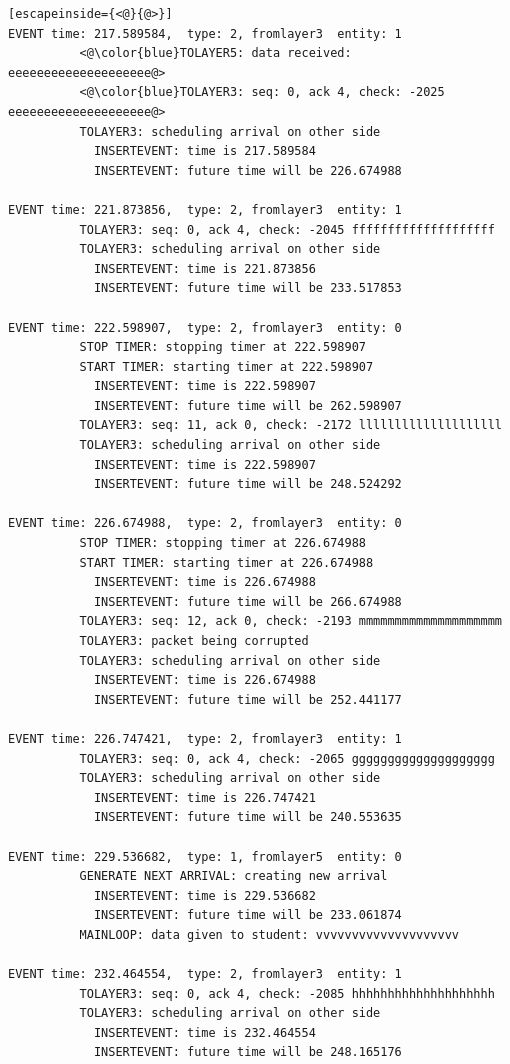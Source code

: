 \documentclass[paper=a4, fontsize=11pt]{scrartcl}
\numberwithin{equation}{section}		%
\numberwithin{figure}{section}			%
\numberwithin{table}{section}				%
\begin{document}
\begin{lstlisting}[escapeinside={<@}{@>}]
EVENT time: 217.589584,  type: 2, fromlayer3  entity: 1
          <@\color{blue}TOLAYER5: data received: eeeeeeeeeeeeeeeeeeee@>
          <@\color{blue}TOLAYER3: seq: 0, ack 4, check: -2025 eeeeeeeeeeeeeeeeeeee@>
          TOLAYER3: scheduling arrival on other side
            INSERTEVENT: time is 217.589584
            INSERTEVENT: future time will be 226.674988

EVENT time: 221.873856,  type: 2, fromlayer3  entity: 1
          TOLAYER3: seq: 0, ack 4, check: -2045 ffffffffffffffffffff
          TOLAYER3: scheduling arrival on other side
            INSERTEVENT: time is 221.873856
            INSERTEVENT: future time will be 233.517853

EVENT time: 222.598907,  type: 2, fromlayer3  entity: 0
          STOP TIMER: stopping timer at 222.598907
          START TIMER: starting timer at 222.598907
            INSERTEVENT: time is 222.598907
            INSERTEVENT: future time will be 262.598907
          TOLAYER3: seq: 11, ack 0, check: -2172 llllllllllllllllllll
          TOLAYER3: scheduling arrival on other side
            INSERTEVENT: time is 222.598907
            INSERTEVENT: future time will be 248.524292

EVENT time: 226.674988,  type: 2, fromlayer3  entity: 0
          STOP TIMER: stopping timer at 226.674988
          START TIMER: starting timer at 226.674988
            INSERTEVENT: time is 226.674988
            INSERTEVENT: future time will be 266.674988
          TOLAYER3: seq: 12, ack 0, check: -2193 mmmmmmmmmmmmmmmmmmmm
          TOLAYER3: packet being corrupted
          TOLAYER3: scheduling arrival on other side
            INSERTEVENT: time is 226.674988
            INSERTEVENT: future time will be 252.441177

EVENT time: 226.747421,  type: 2, fromlayer3  entity: 1
          TOLAYER3: seq: 0, ack 4, check: -2065 gggggggggggggggggggg
          TOLAYER3: scheduling arrival on other side
            INSERTEVENT: time is 226.747421
            INSERTEVENT: future time will be 240.553635

EVENT time: 229.536682,  type: 1, fromlayer5  entity: 0
          GENERATE NEXT ARRIVAL: creating new arrival
            INSERTEVENT: time is 229.536682
            INSERTEVENT: future time will be 233.061874
          MAINLOOP: data given to student: vvvvvvvvvvvvvvvvvvvv

EVENT time: 232.464554,  type: 2, fromlayer3  entity: 1
          TOLAYER3: seq: 0, ack 4, check: -2085 hhhhhhhhhhhhhhhhhhhh
          TOLAYER3: scheduling arrival on other side
            INSERTEVENT: time is 232.464554
            INSERTEVENT: future time will be 248.165176


\end{lstlisting}
\end{document}
